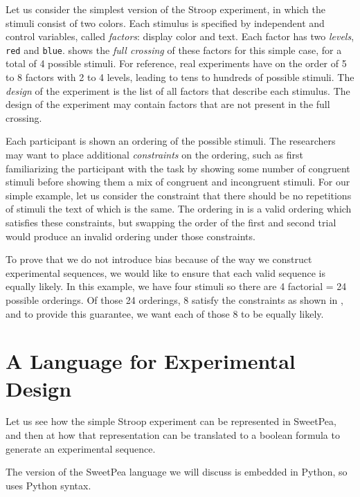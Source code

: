 Let us consider the simplest version of the Stroop experiment, in which the stimuli consist of two colors. Each stimulus is specified by independent and control variables, called \emph{factors}: display color and text. Each factor has two \emph{levels}, \texttt{red} and \texttt{blue}.  shows the \emph{full crossing} of these factors for this simple case, for a total of 4 possible stimuli. For reference, real experiments have on the order of 5 to 8 factors with 2 to 4 levels, leading to tens to hundreds of possible stimuli. The \emph{design} of the experiment is the list of all factors that describe each stimulus. The design of the experiment may contain factors that are not present in the full crossing.

Each participant is shown an ordering of the possible stimuli. The researchers may want to place additional \emph{constraints} on the ordering, such as first familiarizing the participant with the task by showing some number of congruent stimuli before showing them a mix of congruent and incongruent stimuli. For our simple example, let us consider the constraint that there should be no repetitions of stimuli the text of which is the same. The ordering in  is a valid ordering which satisfies these constraints, but swapping the order of the first and second trial would produce an invalid ordering under those constraints.

To prove that we do not introduce bias because of the way we construct experimental sequences, we would like to ensure that each valid sequence is equally likely. In this example, we have four stimuli so there are 4 factorial = 24 possible orderings. Of those 24 orderings, 8 satisfy the constraints as shown in , and to provide this guarantee, we want each of those 8 to be equally likely.






\section{A Language for Experimental Design}

Let us see how the simple Stroop experiment can be represented in SweetPea, and then at how that representation can be translated to a boolean formula to generate an experimental sequence.

The version of the SweetPea language we will discuss is embedded in Python, so uses Python syntax.

